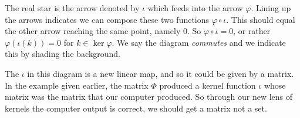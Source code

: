 \documentclass[12pt,twoside,dvipsnames,letterpaper]{memoir}
\begin{document}
The real star is the arrow denoted by $\iota$ which feeds into the arrow $\varphi$.  Lining up the arrows 
indicates we can compose 
these two functions $\varphi\circ \iota$.  This should equal the other 
arrow reaching the same point, namely $0$.  So $\varphi\circ \iota=0$,
or rather $\varphi(\iota(k))=0$ for $k\in \ker\varphi$.  We say the 
diagram \emph{commutes} and we indicate this by shading the background.
\begin{center}
\end{center}
The $\iota$ in this diagram is a new linear map, and so it could be 
given by a matrix.  In the example given earlier, the matrix 
$\Phi$ produced a kernel function $\iota$ whose matrix was the matrix
that our computer produced.  So through our new lens of kernels the 
computer output is correct, we should get a matrix not a set.
\end{document}
